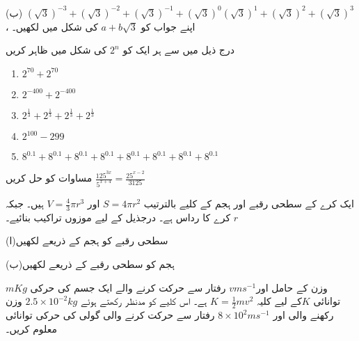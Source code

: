 (ب) \((\sqrt{3})^{-3}+(\sqrt{3})^{-2}+(\sqrt{3})^{-1}+(\sqrt{3})^{0}(\sqrt{3})^{1}+(\sqrt{3})^{2}+(\sqrt{3})^{3}\)
، اپنے جواب کو \( a+b\sqrt{3}\)
 کی شکل میں لکھیں۔

درج ذیل میں سے ہر ایک کو \(2^{n}\) کی شکل میں ظاہر کریں

\begin{multicols}{2}
\begin{enumerate}[.a]
\item
\(2^{70}+2^{70}\)
\item
\(2^{-400}+2^{-400}\)
\item
\(2^{\frac{1}{3}}+2^{\frac{1}{3}}+2^{\frac{1}{3}}+2^{\frac{1}{3}}\)
\item
\(2^{100}-2{99}\)
\item
\(8^{0.1}+8^{0.1}+8^{0.1}+8^{0.1}+8^{0.1}+8^{0.1}+8^{0.1}+8^{0.1}\)
\end{enumerate}
\end{multicols}


مساوات کو حل کریں
\(\frac{125^{3x}}{5^{x+4}}=\frac{25^{x-2}}{3125}\)

ایک کرے کے سطحی رقبے اور ہجم کے کلیے بالترتیب
 \(S=4\pi r^{2}\) 
اور 
\(V=\frac{4}{3}\pi r^{3}\) 
ہیں۔ جبکہ
 \(r\) کرے کا رداس ہے۔ درجذیل کے لیے موزوں تراکیب بنائیے۔

(ا)سطحی رقبے کو ہجم کے ذریعے لکھیں

(ب)ہجم کو سطحی رقبے کے ذریعے لکھیں


\(mKg\) وزن کے حامل  اور\(vms^{-1}\) رفتار سے حرکت کرنے والے ایک جسم کی حرکی توانائی
 \(K\)کے لیے کلیہ \(K=\frac{1}{2}mv^{2}\) ہے۔
اس کلیے کو مدنظر رکھتے ہوئے
 \(2.5\times10^{-2}kg\) وزن رکھنے والی اور
 \(8\times10^{2}ms^{-1}\) رفتار سے حرکت کرنے والی گولی کی حرکی توانائی معلوم کریں۔


